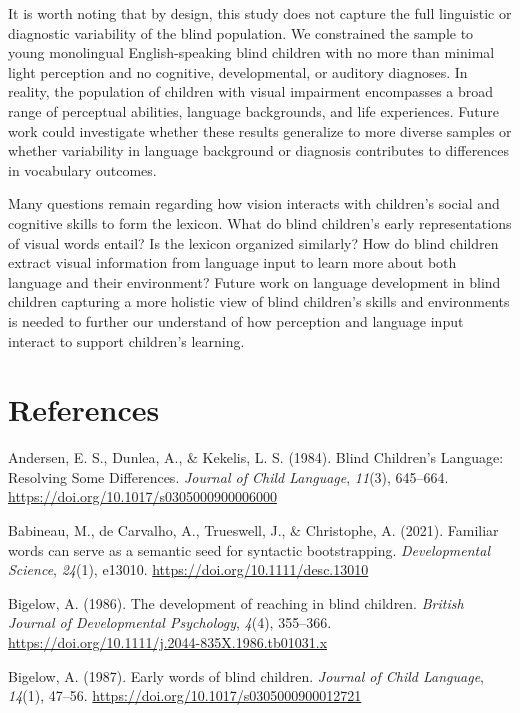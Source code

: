 \documentclass[english,man,floatsintext]{apa6}
\begin{document}
It is worth noting that by design, this study does not capture the full linguistic or diagnostic variability of the blind population. We constrained the sample to young monolingual English-speaking blind children with no more than minimal light perception and no cognitive, developmental, or auditory diagnoses. In reality, the population of children with visual impairment encompasses a broad range of perceptual abilities, language backgrounds, and life experiences. Future work could investigate whether these results generalize to more diverse samples or whether variability in language background or diagnosis contributes to differences in vocabulary outcomes.

Many questions remain regarding how vision interacts with children's social and cognitive skills to form the lexicon. What do blind children's early representations of visual words entail? Is the lexicon organized similarly? How do blind children extract visual information from language input to learn more about both language and their environment? Future work on language development in blind children capturing a more holistic view of blind children's skills and environments is needed to further our understand of how perception and language input interact to support children's learning.

\hypertarget{references}{%
\section*{References}\label{references}}

\hypertarget{refs}{}
\leavevmode\hypertarget{ref-andersen1984}{}%
Andersen, E. S., Dunlea, A., \& Kekelis, L. S. (1984). Blind Children's Language: Resolving Some Differences. \emph{Journal of Child Language}, \emph{11}(3), 645--664. \url{https://doi.org/10.1017/s0305000900006000}

\leavevmode\hypertarget{ref-babineau2021}{}%
Babineau, M., de Carvalho, A., Trueswell, J., \& Christophe, A. (2021). Familiar words can serve as a semantic seed for syntactic bootstrapping. \emph{Developmental Science}, \emph{24}(1), e13010. \url{https://doi.org/10.1111/desc.13010}

\leavevmode\hypertarget{ref-bigelow1986}{}%
Bigelow, A. (1986). The development of reaching in blind children. \emph{British Journal of Developmental Psychology}, \emph{4}(4), 355--366. \url{https://doi.org/10.1111/j.2044-835X.1986.tb01031.x}

\leavevmode\hypertarget{ref-bigelow1987a}{}%
Bigelow, A. (1987). Early words of blind children. \emph{Journal of Child Language}, \emph{14}(1), 47--56. \url{https://doi.org/10.1017/s0305000900012721}
\end{document}

